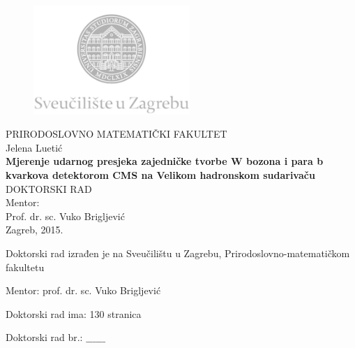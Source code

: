 \documentclass[12pt,oneside, a4paper]{book}
\begin{document}
\begin{titlepage}
  \fontsize{16pt}{20pt}\selectfont
  \selectfont
  \setlength{\intextsep}{0pt plus 0pt minus 0pt}

  \begin{center}
    \begin{figure}[ht!]
      \begin{center}
        \includegraphics[height=4.1184cm, width=5.94cm]{logo_unizg2}
      \end{center}
    \end{figure}		
    \vspace{0cm}
    {PRIRODOSLOVNO MATEMATIČKI FAKULTET} \\
    \vspace{1.8cm}
    Jelena Luetić \\
    \vspace{1.8cm}
    {\fontsize{22pt}{22pt}\selectfont\textbf{Mjerenje udarnog presjeka zajedničke tvorbe W bozona i para b kvarkova detektorom CMS na Velikom hadronskom sudarivaču}} \\
    \vspace{2cm}    
    DOKTORSKI RAD \\
    \vspace{2cm}    %
    Mentor:\\Prof. dr. sc. Vuko Brigljević \\
    \vfill{Zagreb, 2015.}
  \end{center}
\end{titlepage}


\begin{titlepage}
  \begin{minipage}{\dimexpr\textwidth-1cm}
    \vspace{3cm}
    Doktorski rad izrađen je na Sveučilištu u Zagrebu,
    Prirodoslovno-matematičkom fakultetu 

    \vspace{1cm}
    Mentor: prof. dr. sc. Vuko Brigljević

    \vspace{1cm}
    Doktorski rad ima: 130 stranica

    \vspace{1cm}
    Doktorski rad br.: $\_\_\_\_\_\_$
  \end{minipage}
\end{titlepage}



%

\end{document}

